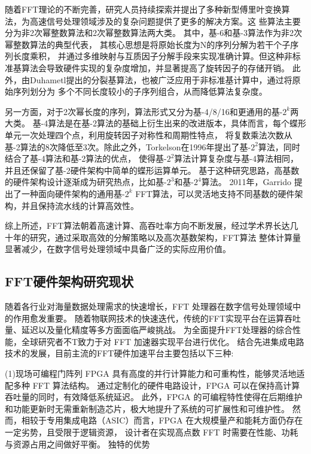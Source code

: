 随着FFT理论的不断完善，研究人员持续探索并提出了多种新型傅里叶变换算法，为高速信号处理领域涉及的复杂问题提供了更多的解决方案。这
些算法主要分为非2次幂整数算法和2次幂整数算法两大类。
其中，基-6\cite{prakash1981new}和基-3\cite{dubois1978new}算法作为非2次幂整数算法的典型代表，
其核心思想是将原始长度为N的序列分解为若干个子序列长度乘积，
并通过多维映射与互质因子分解手段来实现准确计算。但这种非标准基算法会导致硬件实现的复杂度增加，并显著提高了旋转因子的存储开销。
此外，由Duhametl提出的分裂基算法\cite{duhamel1984split}，也被广泛应用于非标准基计算中，通过将原始序列划分为
多个不同长度较小的子序列组合，从而降低算法复杂度。

另一方面，对于2次幂长度的序列，算法形式又分为基-4/8/16和更通用的基-$2^k$两大类。
基-4算法是在基-2算法的基础上衍生出来的改进版本，具体而言，每个蝶形单元一次处理四个点，利用旋转因子对称性和周期性特点，
将复数乘法次数从基-2算法的8次降低至3次。除此之外，Torkelson在1996年提出了基-$2^2$算法，同时结合了基-4算法和基-2算法的优点，
使得基-$2^2$算法计算复杂度与基-4算法相同，并且还保留了基-2硬件架构中简单的蝶形运算单元。
基于这种研究思路，高基数的硬件架构设计逐渐成为研究热点，比如基-$2^3$\cite{adiono200964}和基-$2^4$\cite{fan2006low}算法。
2011年，Garrido\cite{garrido2011pipelined}
提出了一种面向硬件架构的通用基-$2^k$ FFT算法，可以灵活地支持不同基数的硬件架构，并且保持流水线的计算高效性。

综上所述，FFT算法朝着高速计算、高吞吐率方向不断发展，经过学术界长达几十年的研究，通过采取高效的分解策略以及高次基数架构，FFT算法
整体计算量显著减少，在数字信号处理领域中具备广泛的实际应用价值。

\subsection[\hspace{-2pt}FFT加速器硬件研究现状]{{ \hspace{-8pt}}FFT硬件架构研究现状}\label{section 1-2-1}

随着各行业对海量数据处理需求的快速增长，FFT 处理器在数字信号处理领域中的作用愈发重要。
随着物联网技术的快速迭代，传统的FFT实现平台在运算吞吐量、延迟以及量化精度等多方面面临严峻挑战。
为全面提升FFT处理器的综合性能，全球研究者不T致力于对 FFT 加速器实现平台进行优化。
结合先进集成电路技术的发展，目前主流的FFT硬件加速平台主要包括以下三种:

(1)现场可编程门阵列
FPGA 具有高度的并行计算能力和可重构性，能够灵活地适配多种 FFT 算法结构。
通过定制化的硬件电路设计，FPGA 可以在保持高计算吞吐量的同时，有效降低系统延迟。
此外，FPGA 的可编程特性使得在后期维护和功能更新时无需重新制造芯片，极大地提升了系统的可扩展性和可维护性。
然而，相较于专用集成电路（ASIC）而言，FPGA 在大规模量产和能耗方面仍存在一定劣势，且受限于逻辑资源，
设计者在实现高点数 FFT 时需要在性能、功耗与资源占用之间做好平衡。
独特的优势

